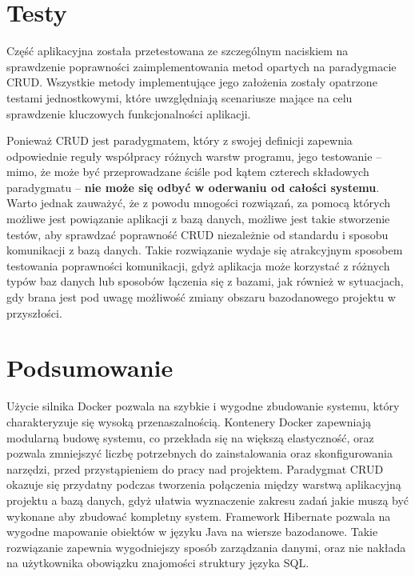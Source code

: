 \documentclass[a4paper,11pt]{article}
\begin{document}
\section{Testy}
Część aplikacyjna została przetestowana ze szczególnym naciskiem na sprawdzenie poprawności zaimplementowania metod opartych na paradygmacie CRUD. Wszystkie metody implementujące jego założenia zostały opatrzone testami jednostkowymi, które uwzględniają scenariusze mające na celu sprawdzenie kluczowych funkcjonalności aplikacji.

Ponieważ CRUD jest paradygmatem, który z swojej definicji zapewnia odpowiednie reguły współpracy różnych warstw programu, jego testowanie -- mimo, że może być przeprowadzane ściśle pod kątem czterech składowych paradygmatu -- \textbf{nie może się odbyć w oderwaniu od całości systemu}. Warto jednak zauważyć, że z powodu mnogości rozwiązań, za pomocą których możliwe jest powiązanie aplikacji z bazą danych, możliwe jest takie stworzenie testów, aby sprawdzać poprawność CRUD niezależnie od standardu i sposobu komunikacji z bazą danych. Takie rozwiązanie wydaje się atrakcyjnym sposobem testowania poprawności komunikacji, gdyż aplikacja może korzystać z różnych typów baz danych lub sposobów łączenia się z bazami, jak również w sytuacjach, gdy brana jest pod uwagę możliwość zmiany obszaru bazodanowego projektu w przyszłości.

\section{Podsumowanie}
Użycie silnika Docker pozwala na szybkie i wygodne zbudowanie systemu, który charakteryzuje się wysoką przenaszalnością. Kontenery Docker zapewniają modularną budowę systemu, co przekłada się na większą elastyczność, oraz pozwala zmniejszyć liczbę potrzebnych do zainstalowania oraz skonfigurowania narzędzi, przed przystąpieniem do pracy nad projektem. Paradygmat CRUD okazuje się przydatny podczas tworzenia połączenia między warstwą aplikacyjną projektu a bazą danych, gdyż ułatwia wyznaczenie zakresu zadań jakie muszą być wykonane aby zbudować kompletny system. Framework Hibernate pozwala na wygodne mapowanie obiektów w języku Java na wiersze bazodanowe. Takie rozwiązanie zapewnia wygodniejszy sposób zarządzania danymi, oraz nie nakłada na użytkownika obowiązku znajomości struktury języka SQL.
\end{document}
